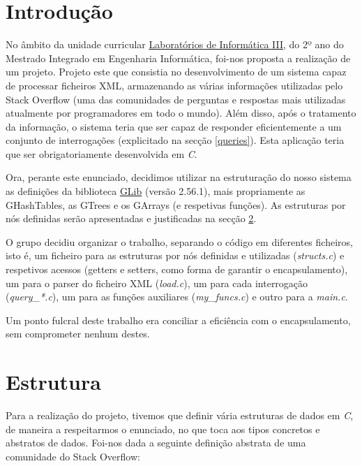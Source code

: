 \documentclass[a4paper, 11pt, oneside]{article}
\begin{document}

\tableofcontents
\lstlistoflistings

\newpage


\section{Introdução}

No âmbito da unidade curricular \underline{Laboratórios de Informática III}, do 2º ano do Mestrado Integrado em Engenharia Informática, foi-nos proposta a realização de um projeto. Projeto este que consistia no desenvolvimento de um sistema capaz de processar ficheiros XML, armazenando as várias informações utilizadas pelo Stack Overflow (uma das comunidades de perguntas e respostas mais utilizadas atualmente por programadores em todo o mundo). Além disso, após o tratamento da informação, o sistema teria que ser capaz de responder eficientemente a um conjunto de interrogações (explicitado na secção \ref{queries}). Esta aplicação teria que ser obrigatoriamente desenvolvida em \textit{C}.

Ora, perante este enunciado, decidimos utilizar na estruturação do nosso sistema as definições da biblioteca \href{https://developer.gnome.org/glib}{GLib} (versão 2.56.1), mais propriamente as GHashTables, as GTrees e os GArrays (e respetivas funções). As estruturas por nós definidas serão apresentadas e justificadas na secção \ref{structs}.

O grupo decidiu organizar o trabalho, separando o código em diferentes ficheiros, isto é, um ficheiro para as estruturas por nós definidas e utilizadas (\textit{structs.c}) e respetivos acessos (getters e setters, como forma de garantir o encapsulamento), um para o parser do ficheiro XML (\textit{load.c}), um para cada interrogação (\textit{query\_*.c}), um para as funções auxiliares (\textit{my\_funcs.c}) e outro para a \textit{main.c}.

Um ponto fulcral deste trabalho era conciliar a eficiência com o encapsulamento, sem comprometer nenhum destes.


\newpage
\section{Estrutura}
\label{structs}

Para a realização do projeto, tivemos que definir vária estruturas de dados em \textit{C}, de maneira a respeitarmos o enunciado, no que toca aos tipos concretos e abstratos de dados. Foi-nos dada a seguinte definição abstrata de uma comunidade do Stack Overflow:
\end{document}
